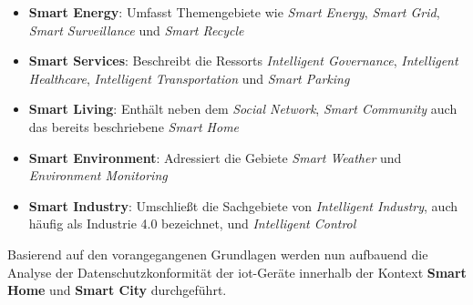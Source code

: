 \begin{itemize}
	\item \textbf{Smart Energy}: Umfasst Themengebiete wie \textit{Smart Energy}, \textit{Smart Grid}, \textit{Smart Surveillance} und \textit{Smart Recycle}
	\item \textbf{Smart Services}: Beschreibt die Ressorts \textit{Intelligent Governance}, \textit{Intelligent Healthcare}, \textit{Intelligent Transportation} und \textit{Smart Parking}
	\item \textbf{Smart Living}: Enthält neben dem \textit{Social Network}, \textit{Smart Community} auch das bereits beschriebene \textit{Smart Home}
	\item \textbf{Smart Environment}: Adressiert die Gebiete \textit{Smart Weather} und \textit{Environment Monitoring}
	\item \textbf{Smart Industry}: Umschließt die Sachgebiete von \textit{Intelligent Industry}, auch häufig als Industrie 4.0 bezeichnet, und \textit{Intelligent Control}
\end{itemize}

\noindent Basierend auf den vorangegangenen Grundlagen werden nun aufbauend die Analyse der Datenschutzkonformität der \ac{iot}-Geräte innerhalb der Kontext \textbf{Smart Home} und \textbf{Smart City} durchgeführt.
